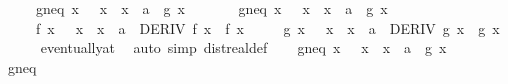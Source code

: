 \begin{isabellebody}
\ \ \ \ \ g{}{\isacharunderscore}{\kern0pt}neq{\isacharunderscore}{\kern0pt}{}{\isacharcolon}{\kern0pt}\ {\isachardoublequoteopen}{\isasymAnd}x{\isachardot}{\kern0pt}\ {}\ {\isacharless}{\kern0pt}\ x\ {\isasymLongrightarrow}\ x\ {\isacharless}{\kern0pt}\ a\ {\isasymLongrightarrow}\ g{}\ x\ {\isasymnoteq}\ {}{\isachardoublequoteclose}\isanewline
\ \ \ \ \ g{\isacharprime}{\kern0pt}{\isacharunderscore}{\kern0pt}neq{\isacharunderscore}{\kern0pt}{}{\isacharcolon}{\kern0pt}\ {\isachardoublequoteopen}{\isasymAnd}x{\isachardot}{\kern0pt}\ {}\ {\isacharless}{\kern0pt}\ x\ {\isasymLongrightarrow}\ x\ {\isacharless}{\kern0pt}\ a\ {\isasymLongrightarrow}\ g{\isacharprime}{\kern0pt}\ x\ {\isasymnoteq}\ {}{\isachardoublequoteclose}\isanewline
\ \ \ \ \ f{}{\isacharcolon}{\kern0pt}\ {\isachardoublequoteopen}{\isasymAnd}x{\isachardot}{\kern0pt}\ {}\ {\isacharless}{\kern0pt}\ x\ {\isasymLongrightarrow}\ x\ {\isacharless}{\kern0pt}\ a\ {\isasymLongrightarrow}\ DERIV\ f{}\ x\ {\isacharcolon}{\kern0pt}{\isachargreater}{\kern0pt}\ {\isacharparenleft}{\kern0pt}f{\isacharprime}{\kern0pt}\ x{\isacharparenright}{\kern0pt}{\isachardoublequoteclose}\isanewline
\ \ \ \ \ g{}{\isacharcolon}{\kern0pt}\ {\isachardoublequoteopen}{\isasymAnd}x{\isachardot}{\kern0pt}\ {}\ {\isacharless}{\kern0pt}\ x\ {\isasymLongrightarrow}\ x\ {\isacharless}{\kern0pt}\ a\ {\isasymLongrightarrow}\ DERIV\ g{}\ x\ {\isacharcolon}{\kern0pt}{\isachargreater}{\kern0pt}\ {\isacharparenleft}{\kern0pt}g{\isacharprime}{\kern0pt}\ x{\isacharparenright}{\kern0pt}{\isachardoublequoteclose}\isanewline
\ \ \ \ \isamarkupfalse%
\ eventually{\isacharunderscore}{\kern0pt}at\ \isamarkupfalse%
\ {\isacharparenleft}{\kern0pt}auto\ simp{\isacharcolon}{\kern0pt}\ dist{\isacharunderscore}{\kern0pt}real{\isacharunderscore}{\kern0pt}def{\isacharparenright}{\kern0pt}\isanewline
\isanewline
\ \ \isamarkupfalse%
\ g{\isacharunderscore}{\kern0pt}neq{\isacharunderscore}{\kern0pt}{}{\isacharcolon}{\kern0pt}\ {\isachardoublequoteopen}{\isasymAnd}x{\isachardot}{\kern0pt}\ {}\ {\isacharless}{\kern0pt}\ x\ {\isasymLongrightarrow}\ x\ {\isacharless}{\kern0pt}\ a\ {\isasymLongrightarrow}\ g\ x\ {\isasymnoteq}\ {}{\isachardoublequoteclose}\isanewline
\ \ \ \ \isamarkupfalse%
\ g{}{\isacharunderscore}{\kern0pt}neq{\isacharunderscore}{\kern0pt}{}\ \isamarkupfalse%

\end{isabellebody}
